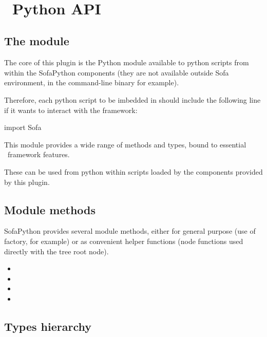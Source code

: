 \

\section{\sofa \ Python API}

\subsection{The  module}

The core of this plugin is the  Python module available to python scripts from within the SofaPython components (they are not available outside Sofa environment, in the command-line  binary for example).

Therefore, each python script to be imbedded in \sofa should include the following line if it wants to interact with the \sofa framework:

\begin{code_python}
import Sofa
\end{code_python}

This module provides a wide range of methods and types, bound to essential \sofa \ framework features.

These can be used from python within scripts loaded by the components provided by this plugin.

\subsection{Module methods}

SofaPython provides several module methods, either for general purpose (use of factory, for example) or as convenient helper functions (node functions used directly with the tree root node).

\begin{itemize}
\item {}
\item {}
\item {}
\item {} 
\end{itemize}

\subsection{Types hierarchy}

